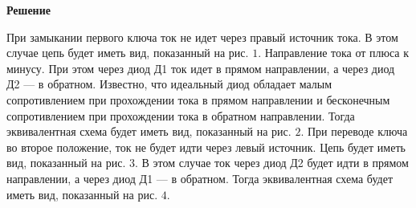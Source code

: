 \documentclass[12pt,a4paper]{article}
\begin{document}
{}{
\smallskip\noindent\textbf{Решение}\par
При замыкании первого ключа ток не идет через правый источник тока. В этом случае цепь будет иметь вид, показанный на рис. $1$. Направление тока от плюса к минусу. При этом через диод Д1 ток идет в прямом направлении, а через диод Д2  — в обратном. Известно, что идеальный диод обладает малым сопротивлением при прохождении тока в прямом направлении и бесконечным сопротивлением при прохождении тока в обратном направлении. Тогда эквивалентная схема будет иметь вид, показанный на рис. $2$. 
При переводе ключа во второе положение, ток не будет идти через левый источник. Цепь будет иметь вид, показанный на рис. $3$. В этом случае ток через диод Д2 будет идти в прямом направлении, а через диод Д1  — в обратном. Тогда эквивалентная схема будет иметь вид, показанный на рис. $4$. 


\begin{center}\begin{tikzpicture}[>=stealth,line width=.6pt]


\end{tikzpicture}
\end{center}}
\end{document}
